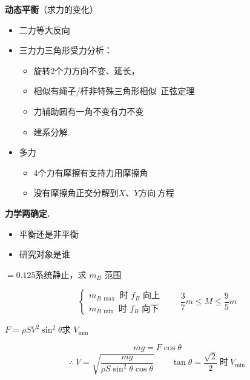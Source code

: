 \medskip
\textbf{动态平衡}\quad （求力的变化）
\begin{itemize}
\item 二力\quad 等大反向
\item 三力\quad 力三角形\quad 受力分析：
  \begin{itemize}
  \item 旋转\quad 2个力方向不变\quad 、延长，
  \item 相似\quad 有绳子/杆\quad 非特殊三角形\quad 相似\ 正弦定理
  \item 力辅助圆\quad 有一角不变\quad 有力不变
  \item 建系分解.
  \end{itemize}
\item 多力 %
  \begin{itemize}
  \item 4个力\quad 有摩擦\quad 有支持力\quad 用摩擦角
  \item 没有摩擦角\quad 正交分解到$X$、$Y$方向\,方程
  \end{itemize}
\end{itemize}
\textbf{力学两确定.}
\begin{itemize}
\item 平衡还是非平衡
\item 研究对象是谁
\end{itemize}
\begin{problem}[1、]
\unclear{$\mu$}$=0.125$\quad 系统静止，求 $m_B$ 范围
\begin{solution}
\[ \begin{cases} m_{B\,\max}\text{ 时 }f_B\text{ 向上}\\[2pt] m_{B\,\min}\text{ 时 }f_B\text{ 向下}\end{cases}\qquad \frac37m\le M\le\frac95m \]
\end{solution}
\end{problem}
\begin{problem}[3]

$F=\rho SV^2\sin^2\theta$\quad 求 $V_{\min}$
\begin{solution}
\[mg=F\cos\theta\]
\[\therefore\ V=\sqrt{\frac{mg}{\rho S\sin^2\theta\cos\theta}}\qquad \tan\theta=\frac{\sqrt{2}}{2}\ \text{时}\ V_{\min}\] %

\end{solution}
\end{problem}
